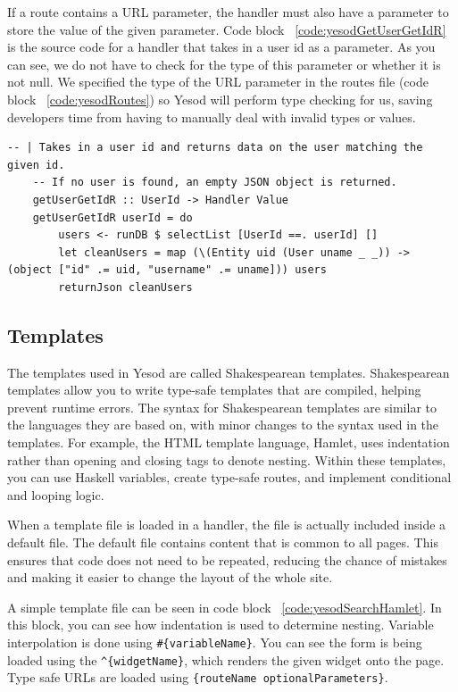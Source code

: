 If a route contains a URL parameter, the handler must also have a parameter to store
the value of the given parameter. Code block ~\ref{code:yesodGetUserGetIdR} is the
source code for a handler that takes in a user id as a parameter. As you can see,
we do not have to check for the type of this parameter or whether it is not null.
We specified the type of the URL parameter in the routes file (code block ~\ref{code:yesodRoutes})
so Yesod will perform type checking for us, saving developers time from having
to manually deal with invalid types or values.

\begin{lstlisting}[caption={GET request handler for getting user data},label={code:yesodGetUserGetIdR}]
	-- | Takes in a user id and returns data on the user matching the given id.
	-- If no user is found, an empty JSON object is returned.
	getUserGetIdR :: UserId -> Handler Value
	getUserGetIdR userId = do
		users <- runDB $ selectList [UserId ==. userId] []
		let cleanUsers = map (\(Entity uid (User uname _ _)) -> (object ["id" .= uid, "username" .= uname])) users
		returnJson cleanUsers
\end{lstlisting}

\subsection{Templates}

The templates used in Yesod are called Shakespearean templates. Shakespearean templates
allow you to write type-safe templates that are compiled, helping prevent runtime errors.
The syntax for Shakespearean templates are similar to the languages they are based on,
with minor changes to the syntax used in the templates. For example, the HTML template language, Hamlet,
uses indentation rather than opening and closing tags to denote nesting. Within these
templates, you can use Haskell variables, create type-safe routes, and implement conditional
and looping logic. \parencite[Shakespearean Templates]{yesodBook}

When a template file is loaded in a handler, the file is actually included inside
a default file. The default file contains content that is common to all pages. This
ensures that code does not need to be repeated, reducing the chance of mistakes and
making it easier to change the layout of the whole site.

A simple template file can be seen in code block ~\ref{code:yesodSearchHamlet}. In this
block, you can see how indentation is used to determine nesting. Variable interpolation
is done using \texttt{\#\{variableName\}}. You can see the form is being loaded using
the \texttt{\string^\{widgetName\}}, which renders the given widget onto the page. Type safe
URLs are loaded using \texttt{\string@\{routeName optionalParameters\}}.

